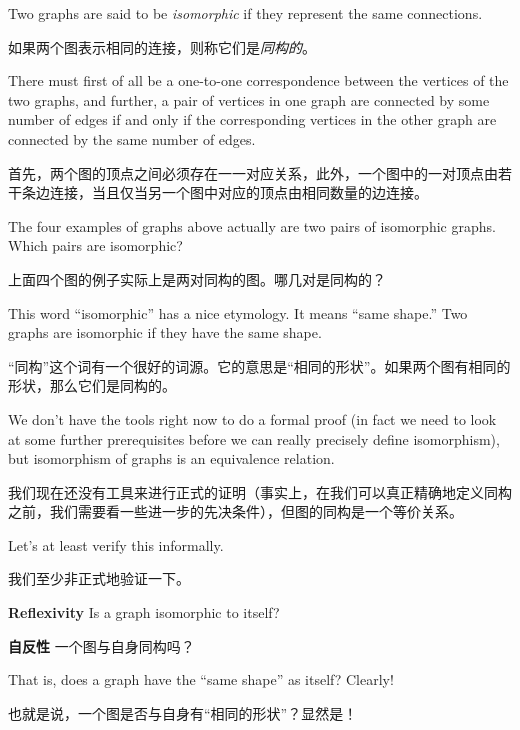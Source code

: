 \begin{center}

\end{center}

Two graphs are said to be  \emph{isomorphic} if they
represent the same connections.

如果两个图表示相同的连接，则称它们是\emph{同构的}。

There must first of all be a one-to-one correspondence
between the vertices of the two graphs, and further, a pair of vertices in one
graph are connected by some number of edges if and only if the corresponding vertices in the other graph
are connected by the same number of edges.

首先，两个图的顶点之间必须存在一一对应关系，此外，一个图中的一对顶点由若干条边连接，当且仅当另一个图中对应的顶点由相同数量的边连接。

\begin{exer}
The four examples of graphs above actually are two pairs of isomorphic graphs.
Which pairs are isomorphic?
\end{exer}

\begin{exer}
上面四个图的例子实际上是两对同构的图。哪几对是同构的？
\end{exer}

This word ``isomorphic'' has a nice etymology.  It means ``same shape.''  Two graphs are
isomorphic if they have the same shape.

“同构”这个词有一个很好的词源。它的意思是“相同的形状”。如果两个图有相同的形状，那么它们是同构的。

We don't have the tools right now to do a formal
proof (in fact we need to look at some further prerequisites before we can really precisely
define isomorphism), but isomorphism of graphs is an equivalence relation.

我们现在还没有工具来进行正式的证明（事实上，在我们可以真正精确地定义同构之前，我们需要看一些进一步的先决条件），但图的同构是一个等价关系。

Let's at least 
verify this informally.

我们至少非正式地验证一下。

{\bf Reflexivity}  Is a graph isomorphic to itself?

{\bf 自反性} 一个图与自身同构吗？

That is, does a graph have the ``same 
shape'' as itself?  Clearly!

也就是说，一个图是否与自身有“相同的形状”？显然是！

